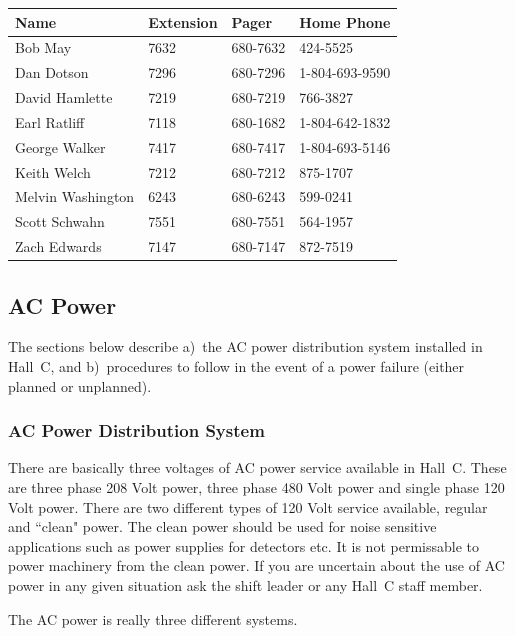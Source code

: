 {\begin{center}
\begin{tabular}{llll}
\hline
Name  & Extension & Pager & Home Phone \\
\hline
Bob May & 7632 & 680-7632 & 424-5525 \\
Dan Dotson & 7296 & 680-7296 & 1-804-693-9590 \\
David Hamlette & 7219 & 680-7219 & 766-3827 \\
Earl Ratliff & 7118 & 680-1682 & 1-804-642-1832 \\
George Walker & 7417 & 680-7417 & 1-804-693-5146 \\
Keith Welch & 7212 & 680-7212 & 875-1707 \\
Melvin Washington & 6243 & 680-6243 & 599-0241 \\
Scott Schwahn & 7551 & 680-7551 & 564-1957 \\
Zach Edwards & 	7147 & 680-7147 & 872-7519 \\
\hline
\end{tabular}
\end{center}


\subsection{AC Power}

The sections below describe a)~the AC power distribution system installed
in Hall~C, and b)~procedures to follow in the event of a power failure
(either planned or unplanned).

\subsubsection{AC Power Distribution System}

There are basically three voltages of AC power service available in Hall~C.
These are three phase 208 Volt power, three phase 480 Volt power and
single phase 120 Volt power. There are two different types of 120 Volt
service available, regular and ``clean" power. The clean power
should be used for noise sensitive applications such as power supplies
for detectors etc. It is not permissable to power machinery from
the clean power. If you are uncertain about the use of AC power in any given
situation ask the shift leader or any Hall~C staff member.

The AC power is really three different systems.

}
